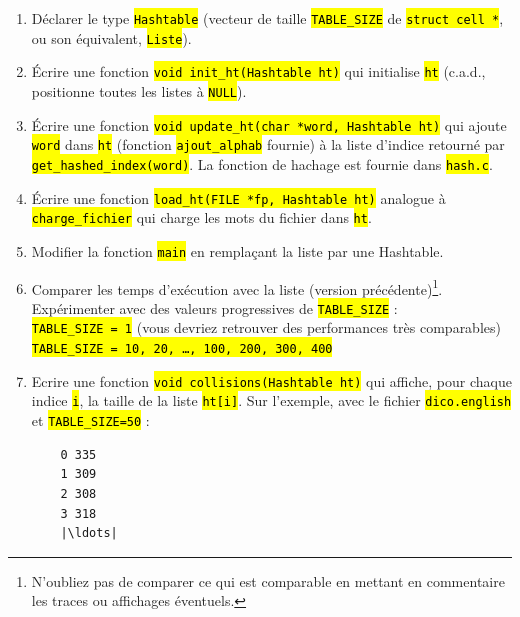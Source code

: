 \documentclass[final, pdftex, a4paper, openbib, ]{article}
\let\OldTexttt\texttt
\renewcommand{\texttt}[1]{\OldTexttt{\hl{#1}}}
\begin{document}
\begin{enumerate}
	\item Déclarer le type \texttt{Hashtable} (vecteur de taille \texttt{TABLE\_SIZE} de \texttt{struct cell *}, ou son équivalent, \texttt{Liste}).
	\item Écrire une fonction \texttt{void init\_ht(Hashtable ht)} qui initialise \texttt{ht} (c.a.d., positionne toutes les listes à \texttt{NULL}).
	\item Écrire une fonction \texttt{void update\_ht(char *word, Hashtable ht)} qui ajoute \texttt{word} dans \texttt{ht} (fonction \texttt{ajout\_alphab} fournie) à la liste d'indice retourné par \texttt{get\_hashed\_index(word)}.
	La fonction de hachage est fournie dans \texttt{hash.c}.
	\item Écrire une fonction \texttt{load\_ht(FILE *fp, Hashtable ht)} analogue à \texttt{charge\_fichier} qui charge les mots du fichier dans \texttt{ht}.
	\item Modifier la fonction \texttt{main} en remplaçant la liste par une Hashtable.
	\item Comparer les temps d'exécution avec la liste (version précédente)\footnote{N'oubliez pas de comparer ce qui est comparable en mettant en commentaire les traces ou affichages éventuels.}. Expérimenter avec des valeurs progressives de \texttt{TABLE\_SIZE} :\\
	\texttt{TABLE\_SIZE = 1} (vous devriez retrouver des performances très comparables)\\
	\texttt{TABLE\_SIZE = 10, 20, \ldots, 100, 200, 300, 400}
	\item Ecrire une fonction \texttt{void collisions(Hashtable ht)} qui affiche, pour chaque indice \texttt{i}, la taille de la liste \texttt{ht[i]}.
	Sur l'exemple, avec le fichier \texttt{dico.english} et \texttt{TABLE\_SIZE=50} : %

	\begin{verbatim}
	0 335
	1 309
	2 308
	3 318
	|\ldots|
	\end{verbatim}

\end{enumerate}
\end{document}
